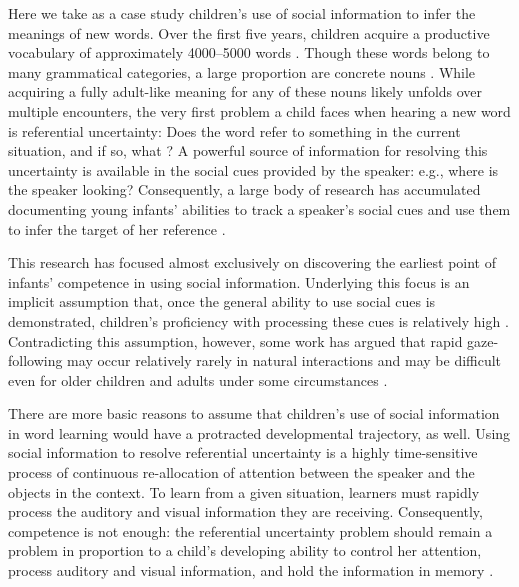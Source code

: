 \documentclass{pnastwo}
\begin{document}
\begin{article}
Here we take as a case study children's use of social information to infer the meanings of new words. Over the first five years, children acquire a productive vocabulary of approximately 4000--5000 words \cite{goulden1990}. Though these words belong to many grammatical categories, a large proportion are concrete nouns \cite{bates1994}. While acquiring a fully adult-like meaning for any of these nouns likely unfolds over multiple encounters, the very first problem a child faces when hearing a new word is referential uncertainty: Does the word refer to something in the current situation, and if so, what \cite{carey1978, yu2007, frank2009}? A powerful source of information for resolving this uncertainty is available in the social cues provided by the speaker: e.g., where is the speaker looking? Consequently, a large body of research has accumulated documenting young infants' abilities to track a speaker's social cues and use them to infer the target of her reference \cite[e.g.][]{scaife1975, baldwin1993, hollich2000, senju2008}.

This research has focused almost exclusively on discovering the earliest point of infants' competence in using social information. Underlying this focus is an implicit assumption that, once the general ability to use social cues is demonstrated, children's proficiency with processing these cues is relatively high \cite[e.g.][]{corkum1998, brooks2005, csibra2009}. Contradicting this assumption, however, some work has argued that rapid gaze-following may occur relatively rarely in natural interactions and may be difficult even for older children and adults under some circumstances \cite{loomis2008, vida2012, yu2013}. 

There are more basic reasons to assume that children's use of social information in word learning would have a protracted developmental trajectory, as well. Using social information to resolve referential uncertainty is a highly time-sensitive process of continuous re-allocation of attention between the speaker and the objects in the context. To learn from a given situation, learners must rapidly process the auditory and visual information they are receiving. Consequently, competence is not enough: the referential uncertainty problem should remain a problem in proportion to a child's developing ability to control her attention, process auditory and visual information, and hold the information in memory \cite{dempster1981, kail1991, gathercole2004}. 


\end{article}
\end{document}
